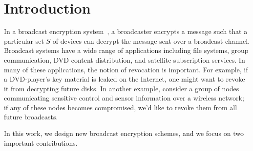 \documentclass[a4paper, 11pt]{article}
\newcommand{\comment}[1]{}
\theoremstyle{definition}
\begin{document}
\thispagestyle{empty}
\newpage
\setcounter{page}{1}

\section{Introduction}

In a broadcast encryption system~\cite{fn93}, a broadcaster encrypts a
message such that a particular set $S$ of devices can decrypt the
message sent over a broadcast channel. Broadcast systems have a wide
range of applications including file systems, group communication, DVD
content distribution, and satellite subscription services.  In many of
these applications, the notion of revocation is important. For
example, if a DVD-player's key material is leaked on the Internet, one
might want to revoke it from decrypting future disks.  In another
example, consider a group of nodes communicating sensitive control and
sensor information over a wireless network; if any of these nodes
becomes compromised, we'd like to revoke them from all future
broadcasts.

\comment{
Over the years, this problem has received a great deal of attention,
and a number of important variants of the problem have been
identified.  One important restriction is that of \emph{stateless}
receivers - where the secret keys stored in the receivers do not need
to be updated over time.  In such stateless systems there is no need
for a user's device to continuously remain on-line to receive key
updates. The stateless feature is extremely useful for many
applications, such as DVD players which only receive input from the
DVD's that are seen by the user (and therefore cannot be relied on to
receive all key updates).  Another important variant of the broadcast
problem is one where a single system can support multiple
broadcasters: In the example of a DVD system, we would not want the
DVD encryption system designer to be an active participant in the
creation of every valid DVD, and also we would not want to trust a
large number of broadcasting entities with the master keys of the
system.  For such systems, symmetric-key cryptography is not
sufficient, and we need \emph{public-key} broadcast encryption
schemes.  These concerns arise in many applications beyond DVD
systems, and therefore it important to address these issues if
possible.
}


In this work, we design new broadcast encryption schemes,
and we focus on two important contributions.
\end{document}
